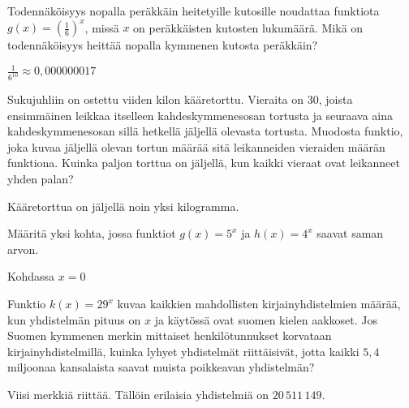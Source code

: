 \begin{tehtavasivu}
\begin{tehtava}
Todennäköisyys nopalla peräkkäin heitetyille kutosille noudattaa funktiota $g(x)=(\frac{1}{6})^{x} $, missä $x$ on peräkkäisten kutosten lukumäärä. Mikä on todennäköisyys heittää nopalla kymmenen kutosta peräkkäin?
\begin{vastaus}
$ \frac{1}{6^{10}}\approx0,000000017$
\end{vastaus}
\end{tehtava}

\begin{tehtava}
Sukujuhliin on ostettu viiden kilon kääretorttu. Vieraita on 30, joista ensimmäinen leikkaa itselleen kahdeskymmenesosan tortusta ja seuraava aina kahdeskymmenesosan sillä hetkellä jäljellä olevasta tortusta. Muodosta funktio, joka kuvaa jäljellä olevan tortun määrää sitä leikanneiden vieraiden määrän funktiona. Kuinka paljon torttua on jäljellä, kun kaikki vieraat ovat leikanneet yhden palan?
\begin{vastaus}
Kääretorttua on jäljellä noin yksi kilogramma.
\end{vastaus}
\end{tehtava}

\begin{tehtava} %
Määritä yksi kohta, jossa funktiot $g(x)=5^{x} $ ja $ h(x)=4^{x} $ saavat saman arvon.
\begin{vastaus}
Kohdassa $x=0$
\end{vastaus}
\end{tehtava}

\begin{tehtava}
Funktio $ k(x)=29^x$ kuvaa kaikkien mahdollisten kirjainyhdistelmien määrää, kun yhdistelmän pituus on $x$ ja käytössä ovat suomen kielen aakkoset. Jos Suomen kymmenen merkin mittaiset henkilötunnukset korvataan kirjainyhdistelmillä, kuinka lyhyet yhdistelmät riittäisivät, jotta kaikki $5,4$ miljoonaa kansalaista saavat muista poikkeavan yhdistelmän?
\begin{vastaus}
Viisi merkkiä riittää. Tällöin erilaisia yhdistelmiä on $20\,511\,149$.
\end{vastaus}
\end{tehtava}

\end{tehtavasivu}